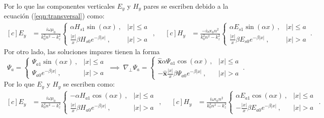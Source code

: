Por lo que las componentes verticales $E_y$ y $H_y$ pares se escriben debido a la ecuación (\ref{eqn:transversal}) como:
\begin{equation*}
	\begin{aligned}[c]
	 E_y &= \frac{i \omega\mu_0}{k_0^2n^2-k_z^2} \left\{\begin{matrix}
	 \alpha H_{s1}\sin(\alpha x) \ ,	 & |x|\le a
	 \\
	 \frac{|x|}{x}\beta H_{s0}e^{-\beta|x|} \ , & |x|>a
	 \end{matrix}\right.
\end{aligned} 
,\quad
	\begin{aligned}[c]
	 H_y &= \frac{-i\omega \epsilon_0 n^2}{k_0^2n^2-k_z^2} \left\{\begin{matrix}
	 \alpha E_{s1}\sin(\alpha x) \ ,	& |x|\le a
	 \\
	 \frac{|x|}{x}\beta E_{s0}e^{-\beta|x|} \ , & |x|>a
	 \end{matrix}\right.
	 \
	 .
\end{aligned} 
\end{equation*}
Por otro lado, las soluciones impares tienen la forma
\begin{equation*}
	\Psi_a = \left\{\begin{matrix}
	\Psi_{a1}\sin(\alpha x) \ , & |x|\le a
	\\
	\Psi_{a0}e^{-\beta|x|} \ , & |x|>a
	\end{matrix}\right.
	\
	\implies
	\
		\nabla_\perp \Psi_a = \left\{\begin{matrix}
	\hat{\textbf{x}}\alpha\Psi_{a1}\cos(\alpha x) \ , & |x|\le a
	\\
	-\hat{\textbf{x}}\frac{|x|}{x}\beta\Psi_{a0}e^{-\beta|x|} \ , & |x|>a
	\end{matrix}\right.
	\
	.
\end{equation*}
Por lo que $E_y$ y $H_y$ se escriben como:
\begin{equation*}
	\begin{aligned}[c]
	 E_y &= \frac{i\omega\mu_0}{k_0^2n^2-k_z^2} \left\{\begin{matrix}
	 -\alpha H_{a1}\cos(\alpha x) \ , & |x|\le a
	 \\
	 \frac{|x|}{x}\beta H_{a0}e^{-\beta|x|} \ , & |x|>a
	 \end{matrix}\right.
\end{aligned} 
,\quad
	\begin{aligned}[c]
	 H_y &= \frac{i\omega \epsilon_0 n^2}{k_0^2n^2-k_z^2} \left\{\begin{matrix}
	  \alpha E_{a1}\cos(\alpha x) \ ,	 & |x|\le a
	 \\
	 -\frac{|x|}{x}\beta E_{a0}e^{-\beta|x|} \ , & |x|>a
	 \end{matrix}\right.
\end{aligned} .
\end{equation*}
